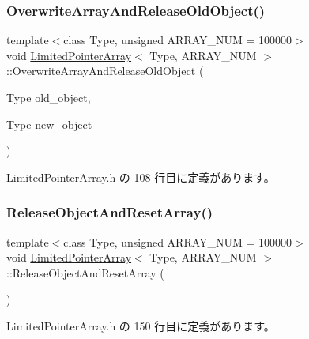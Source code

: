 \subsubsection{\texorpdfstring{Overwrite\+Array\+And\+Release\+Old\+Object()}{OverwriteArrayAndReleaseOldObject()}}
{\footnotesize\ttfamily template$<$class Type, unsigned A\+R\+R\+A\+Y\+\_\+\+N\+UM = 100000$>$ \\
void \mbox{\hyperlink{class_limited_pointer_array}{Limited\+Pointer\+Array}}$<$ Type, A\+R\+R\+A\+Y\+\_\+\+N\+UM $>$\+::Overwrite\+Array\+And\+Release\+Old\+Object (\begin{DoxyParamCaption}\item[{Type}]{old\+\_\+object,  }\item[{Type}]{new\+\_\+object }\end{DoxyParamCaption})\hspace{0.3cm}{\ttfamily [inline]}}



 Limited\+Pointer\+Array.\+h の 108 行目に定義があります。

\mbox{\label{class_limited_pointer_array_a5e34faa11f4b901153f85428027aa21e}} 
\subsubsection{\texorpdfstring{Release\+Object\+And\+Reset\+Array()}{ReleaseObjectAndResetArray()}}
{\footnotesize\ttfamily template$<$class Type, unsigned A\+R\+R\+A\+Y\+\_\+\+N\+UM = 100000$>$ \\
void \mbox{\hyperlink{class_limited_pointer_array}{Limited\+Pointer\+Array}}$<$ Type, A\+R\+R\+A\+Y\+\_\+\+N\+UM $>$\+::Release\+Object\+And\+Reset\+Array (\begin{DoxyParamCaption}{ }\end{DoxyParamCaption})\hspace{0.3cm}{\ttfamily [inline]}}



 Limited\+Pointer\+Array.\+h の 150 行目に定義があります。

